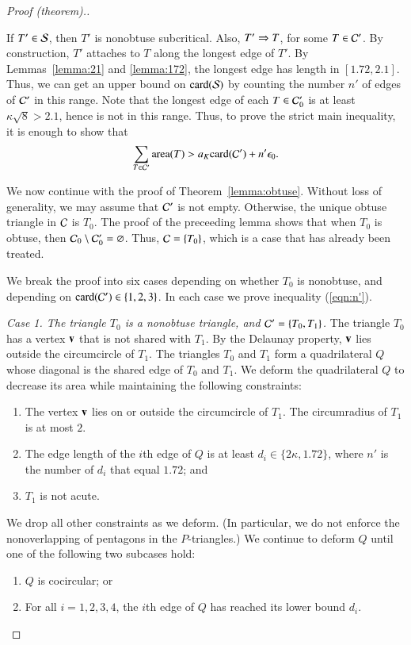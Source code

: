 \begin{proof}[Proof (theorem).]
\begin{remark} If $T'\in\S$, then $T'$ is nonobtuse subcritical.
  Also, $T'\rat T$, for some $T\in \C'$.  By construction, $T'$
  attaches to $T$ along the longest edge of $T'$.  By
  Lemmas~\ref{lemma:21} and \ref{lemma:172}, the longest edge has
  length in $[1.72,2.1]$.  Thus, we can get an upper bound on
  $\card(\S)$ by counting the number $n'$ of edges of $\C'$ in this
  range.  Note that the longest edge of each $T\in \C_0'$ is at least
  $\kappa\sqrt8 > 2.1$, hence is not in this range.  Thus, to prove the
  strict main inequality, it is enough to show that
\begin{equation}\label{eqn:n'}
\sum_{T\in \C'} \area(T) > a_K \card(\C') + n'\epso.
\end{equation}
\end{remark}

We now continue with the proof of Theorem~\ref{lemma:obtuse}.  
Without loss of generality, we may assume that
$\C'$ is not empty.  Otherwise, the unique obtuse
triangle in $\C$ is $T_0$.  The proof of the preceeding lemma shows
that when $T_0$ is obtuse, then $\C_0 \setminus \C_0' = \emptyset$.
Thus, $\C = \{T_0\}$, which is a case that has already been treated.

We break the proof into six cases depending on whether $T_0$ is
nonobtuse, and depending on $\card(\C')\in \{1,2,3\}$.
In each case we prove inequality (\ref{eqn:n'}).


{\it Case 1. The triangle $T_0$ is a nonobtuse triangle, and
  $\C'=\{T_0,T_1\}$.}  The triangle $T_0$ has a vertex $\v$ that is
not shared with $T_1$.  By the Delaunay property, $\v$ lies outside
the circumcircle of $T_1$.  The triangles $T_0$ and $T_1$ form a
quadrilateral $Q$ whose diagonal is the shared edge of $T_0$ and
$T_1$.  We deform the quadrilateral $Q$ to decrease its area while
maintaining the following constraints:
\begin{enumerate}
\item The vertex $\v$ lies on or outside the circumcircle of
  $T_1$. The circumradius of $T_1$ is at most $2$.
\item The edge length of the $i$th edge of $Q$ is at least
  $d_i\in\{2\kappa,1.72\}$,
where $n'$ is the number of $d_i$ that equal $1.72$; and
\item $T_1$ is not acute.
\end{enumerate}
We drop all other constraints as we deform. (In particular, we do not
enforce the nonoverlapping of pentagons in the $P$-triangles.)
We continue to deform $Q$ until one of the following two subcases hold:
\begin{enumerate}
\item $Q$ is cocircular; or
\item For all $i=1,2,3,4$, the $i$th edge of $Q$ has reached its lower
  bound $d_i$.
\end{enumerate}


\end{proof}
